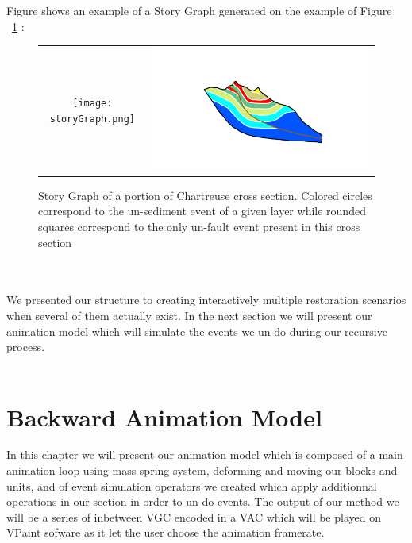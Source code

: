 \documentclass[12pt, a4paper]{report} %
\begin{document}
Figure shows an example of a Story Graph generated on the example of Figure ~\ref{strorygraph} :

\begin{figure}[htb]
\centering
\begin{tabular}{@{}cc@{}}
\texttt{[image: storyGraph.png]}&
\includegraphics[width=.95\textwidth]{chartreusedroite.png}\\
\end{tabular}
\caption{Story Graph of a portion of Chartreuse cross section. Colored circles correspond to the un-sediment event of a given layer while rounded squares correspond to the only un-fault event present in this cross section}
\label{strorygraph}
\end{figure}\\\\

We presented our structure to creating interactively multiple restoration scenarios when several of them actually exist. In the next section we will present our animation model which will simulate the events we un-do during our recursive process.\\\\

\chapter{Backward Animation Model}
\label{ch:animationmodel}
In this chapter we will present our animation model which is composed of a main animation loop using mass spring system, deforming and moving our blocks and units, and of event simulation operators we created which apply additionnal operations in our section in order to un-do events. The output of our method we will be a series of inbetween VGC encoded in a VAC which will be played on VPaint sofware \cite{vpaint} as it let the user choose the animation framerate.\\\\
\end{document}
